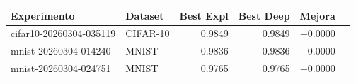 \begin{tabular}{llrrrr}
\toprule
Experimento & Dataset & Best Expl & Best Deep & Mejora \\
\midrule
cifar10-20260304-035119 & CIFAR-10 & 0.9849 & 0.9849 & +0.0000 \\
mnist-20260304-014240 & MNIST & 0.9836 & 0.9836 & +0.0000 \\
mnist-20260304-024751 & MNIST & 0.9765 & 0.9765 & +0.0000 \\
\bottomrule
\end{tabular}